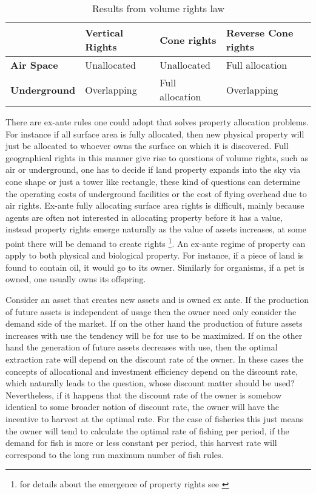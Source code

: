 \documentclass[12pt]{article}
\numberwithin{equation}{section}
\begin{document}
\begin{table}[t]
\begin{tabular}{|l|l|l|l|}
\hline
                     & \textbf{Vertical Rights}       & \textbf{Cone rights}          & \textbf{Reverse Cone rights}  \\ \hline
\textbf{Air Space}   & Unallocated             & Unallocated            & Full allocation \\ \hline
\textbf{Underground} & Overlapping & Full allocation & Overlapping       \\ \hline
\end{tabular}
\caption{Results from volume rights law}
\label{Volume}
\end{table}

There are ex-ante rules one could adopt that solves property allocation problems. For instance if all surface area is fully allocated, then new physical property will just be allocated to whoever owns the surface on which it is discovered. Full geographical rights in this manner give rise to questions of volume rights, such as air or underground, one has to decide if land property expands into the sky via cone shape or just a tower like rectangle, these kind of questions can determine the operating costs of underground facilities or the cost of flying overhead due to air rights. Ex-ante fully allocating surface area rights is difficult, mainly because agents are often not interested in allocating property before it has a value, instead property rights emerge naturally as the value of assets increases, at some point there will be demand to create rights \footnote{for details about the emergence of property rights see \cite{Alchian1973}}. An ex-ante regime of property can apply to both physical and biological property. For instance, if a piece of land is found to contain oil, it would go to its owner. Similarly for organisms, if a pet is owned, one usually owns its offspring.

Consider an asset that creates new assets and is owned ex ante. If the production of future assets is independent of usage then the owner need only consider the demand side of the market. If on the other hand the production of future assets increases with use the tendency will be for use to be maximized. If on the other hand the generation of future assets decreases with use, then the optimal extraction rate will depend on the discount rate of the owner. In these cases the concepts of allocational and investment efficiency depend on the discount rate, which naturally leads to the question, whose discount matter should be used? Nevertheless, if it happens that the discount rate of the owner is somehow identical to some broader notion of discount rate, the owner will have the incentive to harvest at the optimal rate. For the case of fisheries this just means the owner will tend to calculate the optimal rate of fishing per period, if the demand for fish is more or less constant per period, this harvest rate will correspond to the long run maximum number of fish rules.
\end{document}

